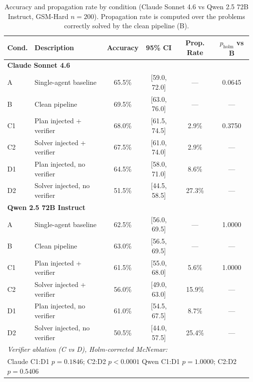 \documentclass[11pt]{article}
\begin{document}
\begin{table}[H]
\centering\small
\begin{tabular}{llcccc}
\toprule
\textbf{Cond.} & \textbf{Description} & \textbf{Accuracy} & \textbf{95\% CI} & \textbf{Prop. Rate} & \textbf{$p_{\mathrm{holm}}$ vs B} \\
\midrule
\multicolumn{6}{l}{\textbf{Claude Sonnet 4.6}} \\
A  & Single-agent baseline          & 65.5\% & [59.0, 72.0] & ---   & 0.0645 \\
B  & Clean pipeline                 & 69.5\% & [63.0, 76.0] & ---   & ---    \\
C1 & Plan injected + verifier       & 68.0\% & [61.5, 74.5] & 2.9\% & 0.3750 \\
C2 & Solver injected + verifier     & 67.5\% & [61.0, 74.0] & 2.9\% & ---   \\
D1 & Plan injected, no verifier     & 64.5\% & [58.0, 71.0] & 8.6\%  & ---   \\
D2 & Solver injected, no verifier   & 51.5\% & [44.5, 58.5] & 27.3\% & ---   \\
\midrule
\multicolumn{6}{l}{\textbf{Qwen 2.5 72B Instruct}} \\
A  & Single-agent baseline          & 62.5\% & [56.0, 69.5] & ---   & 1.0000 \\
B  & Clean pipeline                 & 63.0\% & [56.5, 69.5] & ---   & ---    \\
C1 & Plan injected + verifier       & 61.5\% & [55.0, 68.0] & 5.6\% & 1.0000 \\
C2 & Solver injected + verifier     & 56.0\% & [49.0, 63.0] & 15.9\% & ---   \\
D1 & Plan injected, no verifier     & 61.0\% & [54.5, 67.5] & 8.7\%  & ---   \\
D2 & Solver injected, no verifier   & 50.5\% & [44.0, 57.5] & 25.4\% & ---   \\
\midrule
\multicolumn{6}{l}{\textit{Verifier ablation (C vs D), Holm-corrected McNemar:}} \\
\multicolumn{6}{l}{Claude C1:D1 $p=0.1846$; C2:D2 $p<0.0001$ \qquad Qwen C1:D1 $p=1.0000$; C2:D2 $p=0.5406$} \\
\bottomrule
\end{tabular}
\caption{Accuracy and propagation rate by condition (Claude Sonnet 4.6 vs Qwen 2.5 72B Instruct, GSM-Hard $n=200$). Propagation rate is computed over the problems correctly solved by the clean pipeline (B).}\label{tab:conditions_results}
\end{table}
\end{document}
